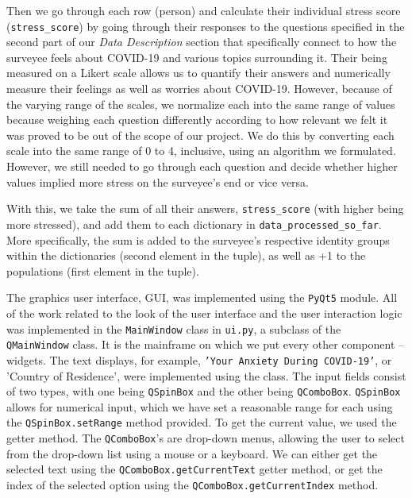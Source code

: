 \documentclass[fontsize=11pt]{article}
\begin{document}
    Then we go through each row (person) and calculate their individual stress score (\texttt{stress\_score}) by going through their responses to the questions specified in the second part of our \textit{Data Description} section that specifically connect to how the surveyee feels about COVID-19 and various topics surrounding it. Their being measured on a Likert scale allows us to quantify their answers and numerically measure their feelings as well as worries about COVID-19.
    However, because of the varying range of the scales, we normalize each into the same range of values because weighing each question differently according to how relevant we felt it was proved to be out of the scope of our project. We do this by converting each scale into the same range of 0 to 4, inclusive, using an algorithm we formulated.
    However, we still needed to go through each question and decide whether higher values implied more stress on the surveyee's end or vice versa.

    With this, we take the sum of all their answers, \texttt{stress\_score} (with higher being more stressed), and add them to each dictionary in \texttt{data\_processed\_so\_far}. More specifically, the sum is added to the surveyee’s respective identity groups within the dictionaries (second element in the tuple), as well as +1 to the populations (first element in the tuple).

    The graphics user interface, GUI, was implemented using the \texttt{PyQt5} module. All of the work related to the look of the user interface and the user interaction logic was implemented in the \texttt{MainWindow} class in \texttt{ui.py}, a subclass of the \texttt{QMainWindow} class. It is the mainframe on which we put every other component -- widgets. The text displays, for example, \texttt{'Your Anxiety During COVID-19'}, or {'Country of Residence'}, were implemented using the  class. The input fields consist of two types, with one being \texttt{QSpinBox} and the other being \texttt{QComboBox}. \texttt{QSpinBox} allows for numerical input, which we have set a reasonable range for each using the \texttt{QSpinBox.setRange} method provided. To get the current value, we used the  getter method. The \texttt{QComboBox}'s are drop-down menus, allowing the user to select from the drop-down list using a mouse or a keyboard. We can either get the selected text using the \texttt{QComboBox.getCurrentText} getter method, or get the index of the selected option using the \texttt{QComboBox.getCurrentIndex} method.
\end{document}
